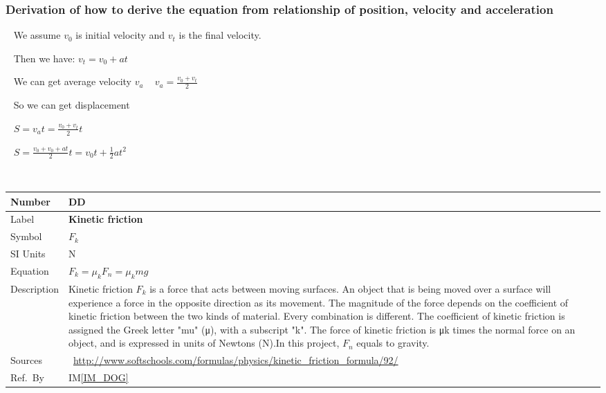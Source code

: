 \documentclass[12pt]{article}
\newcommand{\colAwidth}{0.13\textwidth}
\newcommand{\colBwidth}{0.82\textwidth}
\newcounter{defnum} %
\newcounter{datadefnum} %
\newcommand{\iref}[1]{IM\ref{#1}}
\begin{document}
\subsubsection*{Derivation of how to derive the equation from relationship of position, velocity and acceleration}

~\newline
We assume $v_{0}$ is initial velocity and $v_{t}$ is the final velocity. 

~\newline
Then we have:
$v_{t}=v_{0}+at$

~\newline
We can get average velocity $v_{a}$
~\newline
$v_{a}=\frac{v_{0}+v_{t}}{2}$

~\newline
So we can get displacement

~\newline 
$S=v_{a}t=\frac{v_{0}+v_{t}}{2}t$

~\newline
$S=\frac{v_{0}+v_{0}+at}{2}t=v_{0}t+\frac{1}{2}at^{2}$


~\newline

\noindent
\begin{minipage}{\textwidth}
	\renewcommand*{\arraystretch}{1.5}
	\begin{tabular}{| p{\colAwidth} | p{\colBwidth}|}
		\hline
		\rowcolor[gray]{0.9}
		Number& DD{datadefnum}\thedatadefnum \label{DD_Fk}\\
		\hline
		Label& \bf Kinetic friction\\
		\hline
		Symbol &$F_{k}$\\
		\hline
		SI Units & N\\
		\hline
		Equation&$F_{k}=\mu_{k}F_{n}=\mu_{k}mg$\\
		\hline
		Description & 
		Kinetic friction $F_{k}$ is a force that acts between moving surfaces. An object that is being moved over a surface will experience a force in the opposite direction as its movement. The magnitude of the force depends on the coefficient of kinetic friction between the two kinds of material. Every combination is different. The coefficient of kinetic friction is assigned the Greek letter "mu" (μ), with a subscript "k". The force of kinetic friction is μk times the normal force on an object, and is expressed in units of Newtons (N).In this project, $F_{n}$ equals to gravity.
		\\
		\hline
		Sources&~\url{http://www.softschools.com/formulas/physics/kinetic_friction_formula/92/}  \\
		\hline
		Ref.\ By & \iref{IM_DOG}\\
		\hline
	\end{tabular}
\end{minipage}\\
\end{document}
